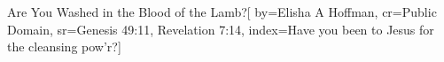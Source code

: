{Are You Washed in the Blood of the Lamb?}[
    by={Elisha A Hoffman},
    cr={Public Domain},
    sr={Genesis 49:11, Revelation 7:14},
    index={Have you been to Jesus for the cleansing pow'r?}]
